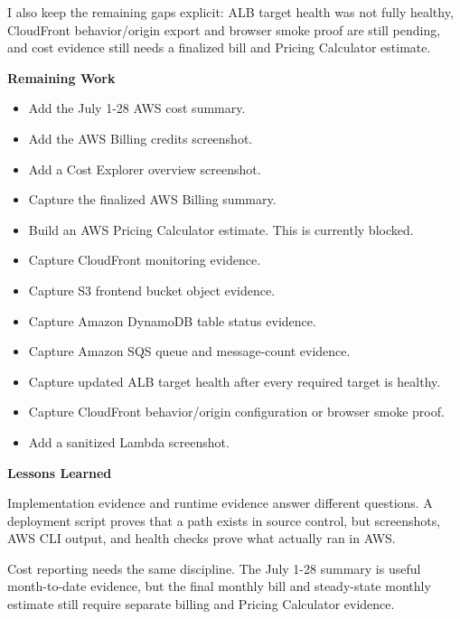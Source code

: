 I also keep the remaining gaps explicit: ALB target health was not fully
healthy, CloudFront behavior/origin export and browser smoke proof are
still pending, and cost evidence still needs a finalized bill and
Pricing Calculator estimate.

\vspace{0.5em}\noindent\textbf{Remaining Work}\par

\begin{itemize}
\tightlist
\item[$\boxtimes$]
  Add the July 1-28 AWS cost summary.
\item[$\boxtimes$]
  Add the AWS Billing credits screenshot.
\item[$\boxtimes$]
  Add a Cost Explorer overview screenshot.
\item[$\square$]
  Capture the finalized AWS Billing summary.
\item[$\square$]
  Build an AWS Pricing Calculator estimate. This is currently blocked.
\item[$\boxtimes$]
  Capture CloudFront monitoring evidence.
\item[$\boxtimes$]
  Capture S3 frontend bucket object evidence.
\item[$\boxtimes$]
  Capture Amazon DynamoDB table status evidence.
\item[$\boxtimes$]
  Capture Amazon SQS queue and message-count evidence.
\item[$\square$]
  Capture updated ALB target health after every required target is
  healthy.
\item[$\square$]
  Capture CloudFront behavior/origin configuration or browser smoke
  proof.
\item[$\boxtimes$]
  Add a sanitized Lambda screenshot.
\end{itemize}

\vspace{0.5em}\noindent\textbf{Lessons Learned}\par

Implementation evidence and runtime evidence answer different questions.
A deployment script proves that a path exists in source control, but
screenshots, AWS CLI output, and health checks prove what actually ran
in AWS.

Cost reporting needs the same discipline. The July 1-28 summary is
useful month-to-date evidence, but the final monthly bill and
steady-state monthly estimate still require separate billing and Pricing
Calculator evidence.
